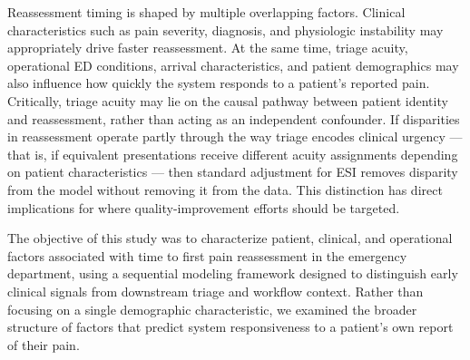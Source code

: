 Reassessment timing is shaped by multiple overlapping factors.
Clinical characteristics such as pain severity, diagnosis, and physiologic instability may appropriately drive faster reassessment.
At the same time, triage acuity, operational ED conditions, arrival characteristics, and patient demographics may also influence how quickly the system responds to a patient's reported pain.
Critically, triage acuity may lie on the causal pathway between patient identity and reassessment, rather than acting as an independent confounder.
If disparities in reassessment operate partly through the way triage encodes clinical urgency --- that is, if equivalent presentations receive different acuity assignments depending on patient characteristics --- then standard adjustment for ESI removes disparity from the model without removing it from the data.
This distinction has direct implications for where quality-improvement efforts should be targeted.

The objective of this study was to characterize patient, clinical, and operational factors associated with time to first pain reassessment in the emergency department, using a sequential modeling framework designed to distinguish early clinical signals from downstream triage and workflow context.
Rather than focusing on a single demographic characteristic, we examined the broader structure of factors that predict system responsiveness to a patient's own report of their pain.
